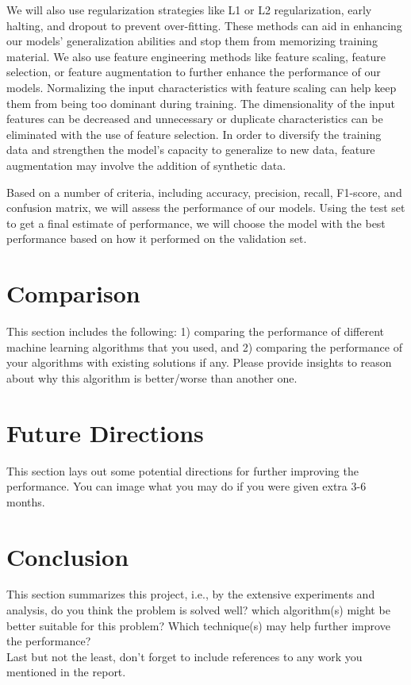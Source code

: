 \documentclass[conference]{IEEEtran}
\begin{document}
We will also use regularization strategies like L1 or L2 regularization, early halting, and dropout to prevent over-fitting. These methods can aid in enhancing our models' generalization abilities and stop them from memorizing training material. We also use feature engineering methods like feature scaling, feature selection, or feature augmentation to further enhance the performance of our models. Normalizing the input characteristics with feature scaling can help keep them from being too dominant during training. The dimensionality of the input features can be decreased and unnecessary or duplicate characteristics can be eliminated with the use of feature selection. In order to diversify the training data and strengthen the model's capacity to generalize to new data, feature augmentation may involve the addition of synthetic data.

Based on a number of criteria, including accuracy, precision, recall, F1-score, and confusion matrix, we will assess the performance of our models. Using the test set to get a final estimate of performance, we will choose the model with the best performance based on how it performed on the validation set.

\section{Comparison}  
This section includes the following: 1) comparing the performance of different machine learning algorithms that you used, and 2) comparing the performance of your algorithms with existing solutions if any. Please provide insights to reason about why this algorithm is better/worse than another one.

\section{Future Directions}
This section lays out some potential directions for further improving the performance. You can image what you may do if you were given extra 3-6 months.

\section{Conclusion}
This section summarizes this project, i.e., by the extensive experiments and analysis, do you think the problem is solved well? which algorithm(s) might be better suitable for this problem? Which technique(s) may help further improve the performance? \\

Last but not the least, don't forget to include references to any work you mentioned in the report.
  



\end{document}
